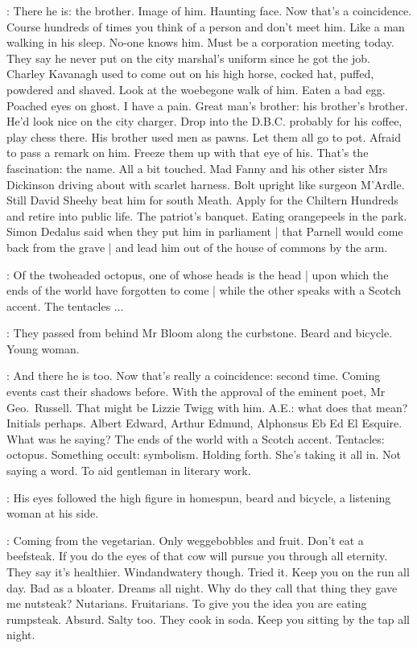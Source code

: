 \BloomInt:
There he is:
the brother.
Image of him.
Haunting face.
Now that's a coincidence.
Course hundreds of times you think of a person and don't meet him.
Like a man walking in his sleep.
No-one knows him.
Must be a corporation meeting today.
They say he never put on the city marshal's uniform since he got the job.
Charley Kavanagh used to come out on his high horse,
cocked hat,
puffed, powdered and shaved.
Look at the woebegone walk of him.
Eaten a bad egg.
Poached eyes on ghost.
I have a pain.
Great man's brother:
his brother's brother.
He'd look nice on the city charger.
Drop into the D.B.C.
probably for his coffee,
play chess there.
His brother used men as pawns.
Let them all go to pot.
Afraid to pass a remark on him.
Freeze them up with that eye of his.
That's the fascination:
the name.
All a bit touched.
Mad Fanny and his other sister Mrs Dickinson
driving about with scarlet harness.
Bolt upright like surgeon M'Ardle.
Still David Sheehy beat him for south Meath.
Apply for the Chiltern Hundreds and retire into public life.
The patriot's banquet.
Eating orangepeels in the park.
Simon Dedalus said when they put him in parliament |
that Parnell would come back from the grave |
and lead him out of the house of commons by the arm.

\AErussell:
Of the twoheaded octopus,
one of whose heads is the head |
upon which the ends of the world have forgotten to come |
while the other speaks with a Scotch accent.
The tentacles ...

:
They passed from behind Mr Bloom along the curbstone.
Beard and bicycle.
Young woman.

\BloomInt:
And there he is too.
Now that's really a coincidence:
second time.
Coming events cast their shadows before.
With the approval of the eminent poet,
Mr Geo.\ Russell.
That might be Lizzie Twigg with him.
A.E.:
what does that mean?
Initials perhaps.
Albert Edward,
Arthur Edmund,
Alphonsus Eb Ed El Esquire.
What was he saying?
The ends of the world with a Scotch accent.
Tentacles:
octopus.
Something occult:
symbolism.
Holding forth.
She's taking it all in.
Not saying a word.
To aid gentleman in literary work.

:
His eyes followed the high figure in homespun,
beard and bicycle,
a listening woman at his side.

\BloomInt:
Coming from the vegetarian.
Only weggebobbles and fruit.
Don't eat a beefsteak.
If you do
the eyes of that cow will pursue you through all eternity.
They say it's healthier.
Windandwatery though.
Tried it.
Keep you on the run all day.
Bad as a bloater.
Dreams all night.
Why do they call that thing they gave me nutsteak?
Nutarians.
Fruitarians.
To give you the idea you are eating rumpsteak.
Absurd.
Salty too.
They cook in soda.
Keep you sitting by the tap all night.

